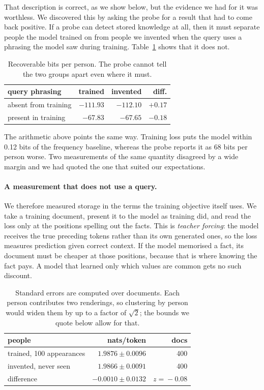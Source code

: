 \documentclass[10pt,twocolumn]{article}
\begin{document}
That description is correct, as we show below, but the evidence we had for it
was worthless. We discovered this by asking the probe for a result that had to
come back positive. If a probe can detect stored knowledge at all, then it must
separate people the model trained on from people we invented when the query
uses a phrasing the model saw during training. Table~\ref{tab:probe} shows that
it does not.

\begin{table}[h]
\centering\small
\begin{tabular}{lrrr}
\toprule
query phrasing & trained & invented & diff. \\
\midrule
absent from training & $-111.93$ & $-112.10$ & $+0.17$ \\
present in training & $-67.83$ & $-67.65$ & $-0.18$ \\
\bottomrule
\end{tabular}
\caption{Recoverable bits per person. The probe cannot tell the two groups
apart even where it must.}
\label{tab:probe}
\end{table}

The arithmetic above points the same way. Training loss puts the model within
0.12 bits of the frequency baseline, whereas the probe reports it as 68 bits
per person worse. Two measurements of the same quantity disagreed by a wide
margin and we had quoted the one that suited our expectations.

\paragraph{A measurement that does not use a query.}
We therefore measured storage in the terms the training objective itself uses.
We take a training document, present it to the model as training did, and read
the loss only at the positions spelling out the facts. This is \emph{teacher
forcing}: the model receives the true preceding tokens rather than its own
generated ones, so the loss measures prediction given correct context. If the
model memorised a fact, its document must be cheaper at those positions,
because that is where knowing the fact pays. A model that learned only which
values are common gets no such discount.

\begin{table}[h]
\centering\small
\begin{tabular}{lrr}
\toprule
people & nats/token & docs \\
\midrule
trained, 100 appearances & $1.9876\!\pm\!0.0096$ & 400 \\
invented, never seen & $1.9866\!\pm\!0.0091$ & 400 \\
difference & $-0.0010\!\pm\!0.0132$ & $z\!=\!-0.08$ \\
\bottomrule
\end{tabular}
\caption{Standard errors are computed over documents. Each person contributes
two renderings, so clustering by person would widen them by up to a factor of
$\sqrt{2}$; the bounds we quote below allow for that.}
\label{tab:store}
\end{table}
\end{document}
